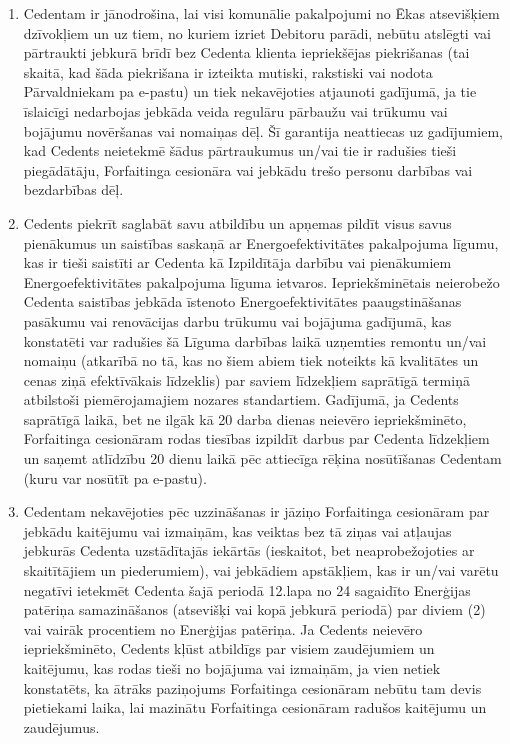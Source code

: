 \documentclass[a4paper]{article}
\begin{document}
\begin{multicols}{2}
\begin{enumerate}
  \item{Cedentam ir jānodrošina, lai visi komunālie pakalpojumi no Ēkas
atsevišķiem dzīvokļiem un uz tiem, no kuriem izriet Debitoru parādi,
nebūtu atslēgti vai pārtraukti jebkurā brīdī bez Cedenta klienta
iepriekšējas piekrišanas (tai skaitā, kad šāda piekrišana ir izteikta
mutiski, rakstiski vai nodota Pārvaldniekam pa e-pastu) un tiek
nekavējoties atjaunoti gadījumā, ja tie īslaicīgi nedarbojas jebkāda
veida regulāru pārbaužu vai trūkumu vai bojājumu novēršanas vai
nomaiņas dēļ. Šī garantija neattiecas uz gadījumiem, kad Cedents
neietekmē šādus pārtraukumus un/vai tie ir radušies tieši piegādātāju,
Forfaitinga cesionāra vai jebkādu trešo personu darbības vai
bezdarbības dēļ.}

  \item{Cedents piekrīt saglabāt savu atbildību un apņemas pildīt visus savus
pienākumus un saistības saskaņā ar Energoefektivitātes pakalpojuma
līgumu, kas ir tieši saistīti ar Cedenta kā Izpildītāja darbību vai
pienākumiem Energoefektivitātes pakalpojuma līguma ietvaros.
Iepriekšminētais neierobežo Cedenta saistības jebkāda īstenoto
Energoefektivitātes paaugstināšanas pasākumu vai renovācijas darbu
trūkumu vai bojājuma gadījumā, kas konstatēti var radušies šā Līguma
darbības laikā uzņemties remontu un/vai nomaiņu (atkarībā no tā, kas
no šiem abiem tiek noteikts kā kvalitātes un cenas ziņā efektīvākais
līdzeklis) par saviem līdzekļiem saprātīgā termiņā atbilstoši
piemērojamajiem nozares standartiem. Gadījumā, ja Cedents saprātīgā
laikā, bet ne ilgāk kā 20 darba dienas neievēro iepriekšminēto,
Forfaitinga cesionāram rodas tiesības izpildīt darbus par Cedenta
līdzekļiem un saņemt atlīdzību 20 dienu laikā pēc attiecīga rēķina
nosūtīšanas Cedentam (kuru var nosūtīt pa e-pastu).}

  \item{Cedentam nekavējoties pēc uzzināšanas ir jāziņo Forfaitinga
cesionāram par jebkādu kaitējumu vai izmaiņām, kas veiktas bez tā
ziņas vai atļaujas jebkurās Cedenta uzstādītajās iekārtās (ieskaitot, bet
neaprobežojoties ar skaitītājiem un piederumiem), vai jebkādiem
apstākļiem, kas ir un/vai varētu negatīvi ietekmēt Cedenta šajā periodā
12.lapa no 24 sagaidīto Enerģijas patēriņa samazināšanos (atsevišķi vai kopā jebkurā
periodā) par diviem (2) vai vairāk procentiem no Enerģijas patēriņa. Ja
Cedents neievēro iepriekšminēto, Cedents kļūst atbildīgs par visiem
zaudējumiem un kaitējumu, kas rodas tieši no bojājuma vai izmaiņām,
ja vien netiek konstatēts, ka ātrāks paziņojums Forfaitinga cesionāram
nebūtu tam devis pietiekami laika, lai mazinātu Forfaitinga cesionāram
radušos kaitējumu un zaudējumus.}


\end{enumerate}
\end{multicols}
\end{document}
